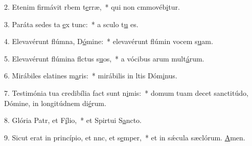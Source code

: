 2. Etenim firmávit rbem t\uline{e}rræ,~* qui non cmmovéb\uline{i}tur.\par 
3. Paráta sedes ta \uline{e}x tunc:~* a sculo t\uline{u} es.\par 
4. Elevavérunt flúmna, D\uline{ó}mine:~* elevavérunt flúmin vocem s\uline{u}am.\par 
5. Elevavérunt flúmina flctus s\uline{u}os,~* a vócibus arum mult\uline{á}rum.\par 
6. Mirábiles elatines m\uline{a}ris:~* mirábilis in ltis Dóm\uline{i}nus.\par 
7. Testimónia tua credibília fact sunt n\uline{i}mis:~* domum tuam decet sanctitúdo, Dómine, in longitúdnem di\uline{é}rum.\par 
8. Glória Patr, et F\uline{í}lio,~* et Spirtui S\uline{a}ncto.\par 
9. Sicut erat in princípio, et nnc, et s\uline{e}mper,~* et in sǽcula sæclórum. \uline{A}men.\par 
